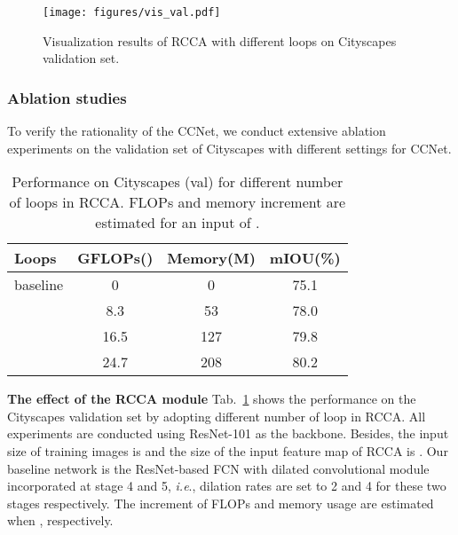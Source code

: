 \documentclass[10pt,journal,compsoc]{IEEEtran}
\def\ie{\emph{i.e}.} \def\Ie{\emph{I.e}.}
\begin{document}
\begin{figure*}[!t]
    \centering
    \texttt{[image: figures/vis\_val.pdf]}
    \caption{Visualization results of RCCA with different loops on Cityscapes validation set.}
    \label{fig:val_r}
    \vspace{-0mm}
\end{figure*}

\subsubsection{Ablation studies}
To verify the rationality of the CCNet, we conduct extensive ablation experiments on the validation set of Cityscapes with different settings for CCNet.

\begin{table}[!t]
    \renewcommand{\arraystretch}{1.3}
    \setlength{\tabcolsep}{0.6em}
    \caption{Performance on Cityscapes (val) for different number of loops in RCCA. FLOPs and memory increment are estimated for an input of .}
    \label{tab:ablation_r}
    \centering \small
    \begin{tabular}{|l|c|c|c|}
        \hline
        Loops & GFLOPs() & Memory(M) & mIOU(\%)  \\
        \hline
        baseline & 0 & 0 & 75.1 \\
         & 8.3 & 53 & 78.0 \\
         & 16.5 & 127 & 79.8 \\
         & 24.7 & 208 & 80.2 \\
        \hline
    \end{tabular}
\end{table}
    
\vspace{1em}
\noindent\textbf{The effect of the RCCA module}
Tab.~\ref{tab:ablation_r} shows the performance on the Cityscapes validation set by adopting different number of loop in RCCA. All experiments are conducted using ResNet-101 as the backbone. Besides, the input size of training images is  and the size of the input feature map  of RCCA is . Our baseline network is the ResNet-based FCN with dilated convolutional module incorporated at stage 4 and 5, \ie, dilation rates are set to 2 and 4 for these two stages respectively. The increment of FLOPs and memory usage are estimated when , respectively. 
\end{document}
